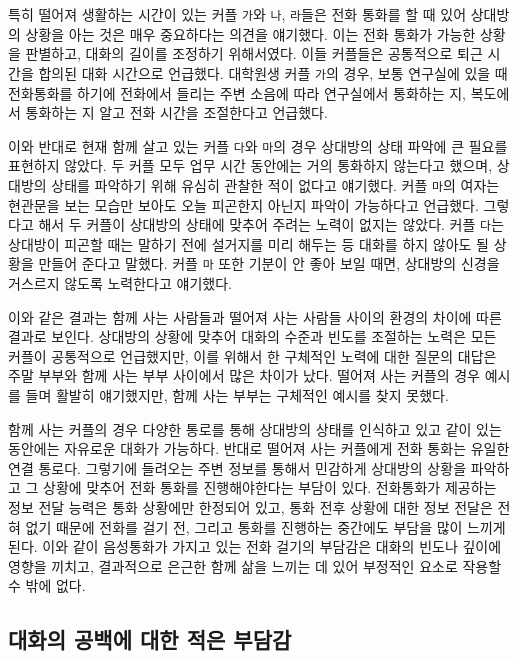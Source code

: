 특히 떨어져 생활하는 시간이 있는 커플 \texttt{가}와 \texttt{나}, \texttt{라}들은 전화 통화를 할 때 있어 상대방의 상황을 아는 것은 매우 중요하다는 의견을 얘기했다. 이는 전화 통화가 가능한 상황을 판별하고, 대화의 길이를 조정하기 위해서였다. 이들 커플들은 공통적으로 퇴근 시간을 합의된 대화 시간으로 언급했다. 대학원생 커플 \texttt{가}의 경우, 보통 연구실에 있을 때 전화통화를 하기에 전화에서 들리는 주변 소음에 따라 연구실에서 통화하는 지, 복도에서 통화하는 지 알고 전화 시간을 조절한다고 언급했다.

이와 반대로 현재 함께 살고 있는 커플 \texttt{다}와 \texttt{마}의 경우 상대방의 상태 파악에 큰 필요를 표현하지 않았다. 두 커플 모두 업무 시간 동안에는 거의 통화하지 않는다고 했으며, 상대방의 상태를 파악하기 위해 유심히 관찰한 적이 없다고 얘기했다. 커플 \texttt{마}의 여자는 현관문을 보는 모습만 보아도 오늘 피곤한지 아닌지 파악이 가능하다고 언급했다. 그렇다고 해서 두 커플이 상대방의 상태에 맞추어 주려는 노력이 없지는 않았다. 커플 \texttt{다}는 상대방이 피곤할 때는 말하기 전에 설거지를 미리 해두는 등 대화를 하지 않아도 될 상황을 만들어 준다고 말했다. 커플 \texttt{마} 또한 기분이 안 좋아 보일 때면, 상대방의 신경을 거스르지 않도록 노력한다고 얘기했다.

이와 같은 결과는 함께 사는 사람들과 떨어져 사는 사람들 사이의 환경의 차이에 따른 결과로 보인다. 상대방의 상황에 맞추어 대화의 수준과 빈도를 조절하는 노력은 모든 커플이 공통적으로 언급했지만, 이를 위해서 한 구체적인 노력에 대한 질문의 대답은 주말 부부와 함께 사는 부부 사이에서 많은 차이가 났다. 떨어져 사는 커플의 경우 예시를 들며 활발히 얘기했지만, 함께 사는 부부는 구체적인 예시를 찾지 못했다.

함께 사는 커플의 경우 다양한 통로를 통해 상대방의 상태를 인식하고 있고 같이 있는 동안에는 자유로운 대화가 가능하다. 반대로 떨어져 사는 커플에게 전화 통화는 유일한 연결 통로다. 그렇기에 들려오는 주변 정보를 통해서 민감하게 상대방의 상황을 파악하고 그 상황에 맞추어 전화 통화를 진행해야한다는 부담이 있다.  전화 통화가 제공하는 정보 전달 능력은 통화 상황에만 한정되어 있고, 통화 전후 상황에 대한 정보 전달은 전혀 없기 때문에 전화를 걸기 전, 그리고 통화를 진행하는 중간에도 부담을 많이 느끼게 된다. 이와 같이 음성 통화가 가지고 있는 전화 걸기의 부담감은 대화의 빈도나 깊이에 영향을 끼치고, 결과적으로 은근한 함께 삶을 느끼는 데 있어 부정적인 요소로 작용할 수 밖에 없다.


\subsection{대화의 공백에 대한 적은 부담감}

